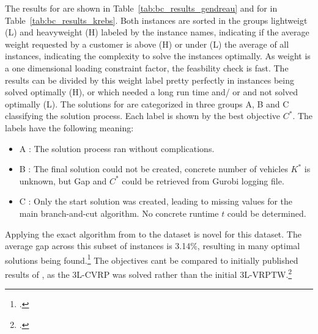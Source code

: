 The results for \gendreauDataSetText are shown in Table~\ref{tab:bc_results_gendreau} and for \krebsADataSetText in Table~\ref{tab:bc_results_krebs}.
Both instances are sorted in the groups lightweigt (L) and heavyweight (H) labeled by the instance names, indicating if the average weight
requested by a customer is above (H) or under (L) the average of all instances, indicating the complexity to solve the instances optimally.
As weight is a one dimensional loading constraint factor, the feasbility check is fast. The results can be divided by this weight label
pretty perfectly in instances being solved optimally (H), or which needed a long run time and/ or and not solved optimally (L).
The solutions for \krebsADataSetText are categorized in three groups A, B and C classifying the solution process. Each label is shown
by the best objective $C^*$. The labels have the following meaning:
\begin{itemize}
	\item A : The solution process ran without complications.
	\item B : The final solution could not be created, concrete number of vehicles $K^*$ is unknown, but Gap and $C^*$ could be retrieved from Gurobi logging file.
	\item C : Only the start solution was created, leading to missing values for the main branch-and-cut algorithm. No concrete runtime $t$ could be determined.
\end{itemize}

Applying the exact algorithm from \cite{tamke_branch-and-cut_2024} to the \krebsADataSetText dataset is novel for this dataset.
The average gap across this subset of instances is 3.14\%, resulting in many optimal solutions being found.\footcite[cf.][]{tamke_branch-and-cut_2024}
The objectives cant be compared to initially published results of \cite{krebs_advanced_2021}, as the \gls{3L-CVRP} was solved rather than the initial \gls{3L-VRPTW}.\footcite[cf.][pp. 858–864]{krebs_advanced_2021}

